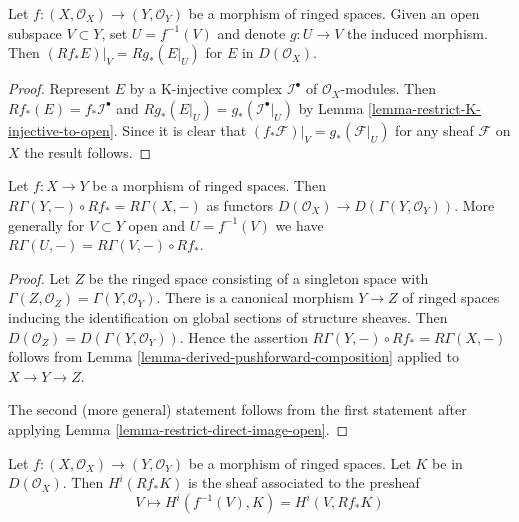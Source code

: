 \begin{lemma}
\label{lemma-restrict-direct-image-open}
Let $f : (X, \mathcal{O}_X) \to (Y, \mathcal{O}_Y)$ be a morphism of ringed
spaces. Given an open subspace $V \subset Y$, set $U = f^{-1}(V)$ and denote
$g : U \to V$ the induced morphism. Then
$(Rf_*E)|_V = Rg_*(E|_U)$ for $E$ in $D(\mathcal{O}_X)$.
\end{lemma}

\begin{proof}
Represent $E$ by a K-injective complex $\mathcal{I}^\bullet$ of
$\mathcal{O}_X$-modules. Then $Rf_*(E) = f_*\mathcal{I}^\bullet$
and $Rg_*(E|_U) = g_*(\mathcal{I}^\bullet|_U)$ by
Lemma \ref{lemma-restrict-K-injective-to-open}.
Since it is clear that $(f_*\mathcal{F})|_V = g_*(\mathcal{F}|_U)$
for any sheaf $\mathcal{F}$ on $X$ the result follows.
\end{proof}

\begin{lemma}
\label{lemma-Leray-unbounded}
Let $f : X \to Y$ be a morphism of ringed spaces.
Then $R\Gamma(Y, -) \circ Rf_* = R\Gamma(X, -)$ as functors
$D(\mathcal{O}_X) \to D(\Gamma(Y, \mathcal{O}_Y))$.
More generally for $V \subset Y$ open and $U = f^{-1}(V)$
we have $R\Gamma(U, -) = R\Gamma(V, -) \circ Rf_*$.
\end{lemma}

\begin{proof}
Let $Z$ be the ringed space consisting of a singleton
space with $\Gamma(Z, \mathcal{O}_Z) = \Gamma(Y, \mathcal{O}_Y)$.
There is a canonical morphism $Y \to Z$ of ringed spaces
inducing the identification on global sections of structure sheaves.
Then $D(\mathcal{O}_Z) = D(\Gamma(Y, \mathcal{O}_Y))$.
Hence the assertion $R\Gamma(Y, -) \circ Rf_* = R\Gamma(X, -)$
follows from Lemma \ref{lemma-derived-pushforward-composition}
applied to $X \to Y \to Z$.

\medskip\noindent
The second (more general) statement follows from the first statement
after applying Lemma \ref{lemma-restrict-direct-image-open}.
\end{proof}

\begin{lemma}
\label{lemma-unbounded-describe-higher-direct-images}
Let $f : (X, \mathcal{O}_X) \to (Y, \mathcal{O}_Y)$ be a morphism of ringed
spaces. Let $K$ be in $D(\mathcal{O}_X)$. Then $H^i(Rf_*K)$ is the sheaf
associated to the presheaf
$$
V \mapsto H^i(f^{-1}(V), K) = H^i(V, Rf_*K)
$$
\end{lemma}

